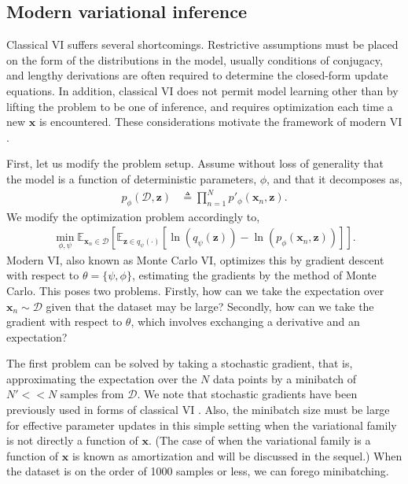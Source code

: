 \subsection{Modern variational inference}\label{sec:modern-vi}
Classical VI suffers several shortcomings. Restrictive assumptions must be placed on the form of the distributions in the model, usually conditions of conjugacy, and lengthy derivations are often required to determine the closed-form update equations. In addition, classical VI does not permit model learning other than by lifting the problem to be one of inference, and requires optimization each time a new $\mathbf{x}$ is encountered. These considerations motivate the framework of modern VI \citep{RezendeEtAl2014, KingmaWelling2013, zhang2018advances}.

First, let us modify the problem setup. Assume without loss of generality that the model is a function of deterministic parameters, $\phi$, and that it decomposes as,
\begin{align*}
	p_\phi(\mathcal{D},\mathbf{z}) &\triangleq \prod_{n=1}^Np'_\phi(\mathbf{x}_n,\mathbf{z}).
\end{align*}
We modify the optimization problem accordingly to,
\begin{align*}
	\min_{\phi,\psi}\mathbb{E}_{\mathbf{x}_n\in\mathcal{D}}\left[\mathbb{E}_{\mathbf{z}\in q_\psi(\cdot)}\left[\ln\left(q_\psi\left(\mathbf{z}\right)\right) - \ln\left(p_\phi\left(\mathbf{x}_n,\mathbf{z}\right)\right)\right]\right].
\end{align*}
Modern VI, also known as Monte Carlo VI, optimizes this by gradient descent with respect to $\theta=\{\psi,\phi\}$, estimating the gradients by the method of Monte Carlo. This poses two problems. Firstly, how can we take the expectation over $\mathbf{x}_n\sim\mathcal{D}$ given that the dataset may be large? Secondly, how can we take the gradient with respect to $\theta$, which involves exchanging a derivative and an expectation?

The first problem can be solved by taking a stochastic gradient, that is, approximating the expectation over the $N$ data points by a minibatch of $N'<<N$ samples from $\mathcal{D}$. We note that stochastic gradients have been previously used in forms of classical VI \citep{HoffmanEtAl2013}. Also, the minibatch size must be large for effective parameter updates in this simple setting when the variational family is not directly a function of $\mathbf{x}$. (The case of when the variational family is a function of $\mathbf{x}$ is known as amortization and will be discussed in the sequel.) When the dataset is on the order of 1000 samples or less, we can forego minibatching.

